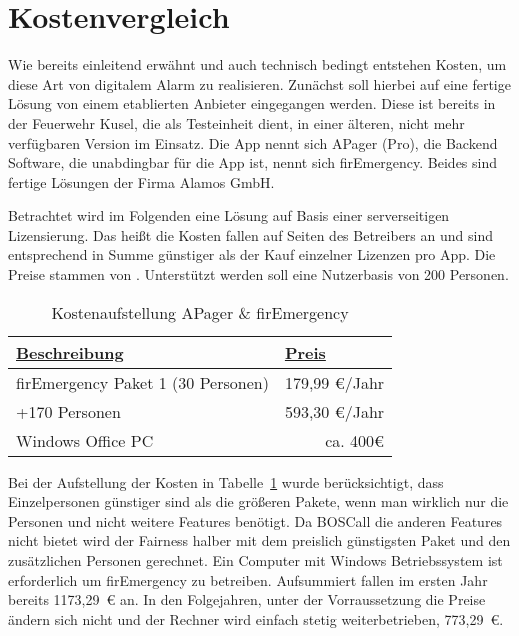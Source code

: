 \section{Kostenvergleich}
\label{sec:kostenvergleich}
Wie bereits einleitend erwähnt und auch technisch bedingt entstehen Kosten, um diese Art von digitalem Alarm zu realisieren. Zunächst soll hierbei auf eine fertige Lösung von einem etablierten Anbieter eingegangen werden. Diese ist bereits in der Feuerwehr Kusel, die als Testeinheit dient, in einer älteren, nicht mehr verfügbaren Version im Einsatz. Die App nennt sich APager (Pro), die Backend Software, die unabdingbar für die App ist, nennt sich firEmergency. Beides sind fertige Lösungen der Firma Alamos GmbH.

Betrachtet wird im Folgenden eine Lösung auf Basis einer serverseitigen Lizensierung. Das heißt die Kosten fallen auf Seiten des Betreibers an und sind entsprechend in Summe günstiger als der Kauf einzelner Lizenzen pro App. Die Preise stammen von \cite{Alamos:FE2Pricing}. Unterstützt werden soll eine Nutzerbasis von 200 Personen.
\begin{table}[]
	\centering
	\caption{Kostenaufstellung APager \& firEmergency}
	\label{tbl:FE2Pricing}
	\begin{tabular}{|l|r|}
		\hline
		{\ul \textbf{Beschreibung}}        & \multicolumn{1}{l|}{{\ul \textbf{Preis}}} \\ \hline
		firEmergency Paket 1 (30 Personen) & 179,99 €/Jahr                             \\ \hline
		+170 Personen                      & 593,30 €/Jahr                             \\ \hline
		Windows Office PC                  & ca. 400€                                  \\ \hline
	\end{tabular}
\end{table}

Bei der Aufstellung der Kosten in Tabelle~\ref{tbl:FE2Pricing} wurde berücksichtigt, dass Einzelpersonen günstiger sind als die größeren Pakete, wenn man wirklich nur die Personen und nicht weitere Features benötigt. Da BOSCall die anderen Features nicht bietet wird der Fairness halber mit dem preislich günstigsten Paket und den zusätzlichen Personen gerechnet. Ein Computer mit Windows Betriebssystem ist erforderlich um firEmergency zu betreiben.\cite{Alamos:FE2SystemRequirements} Aufsummiert fallen im ersten Jahr bereits 1173,29~€ an. In den Folgejahren, unter der Vorraussetzung die Preise ändern sich nicht und der Rechner wird einfach stetig weiterbetrieben, 773,29~€.


